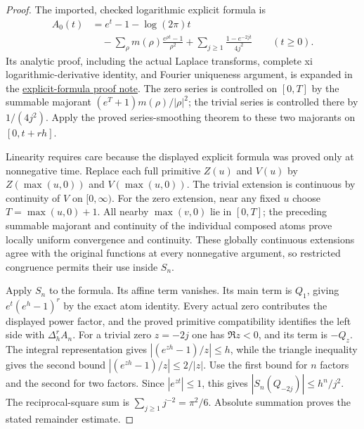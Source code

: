 \begin{proof}
The imported, checked logarithmic explicit formula is
\[
 \begin{aligned}
 A_0(t)&=e^t-1-\log(2\pi)t\\
 &\quad-\sum_\rho m(\rho)\frac{e^{\rho t}-1}{\rho^2}
 +\sum_{j\geq1}\frac{1-e^{-2jt}}{4j^2}\qquad(t\geq0).
 \end{aligned}
\]
Its analytic proof, including the actual Laplace transforms, complete
xi logarithmic-derivative identity, and Fourier uniqueness argument,
is expanded in the
\href{https://github.com/TomasOrtega/Sidon/blob/master/docs/log-smoothed-explicit-formula.md}{explicit-formula proof note}.
The zero series is controlled on $[0,T]$ by the summable majorant
$(e^T+1)m(\rho)/|\rho|^2$; the trivial series is controlled there by
$1/(4j^2)$.  Apply the proved series-smoothing theorem to these two
majorants on $[0,t+rh]$.

Linearity requires care because the displayed explicit formula was
proved only at nonnegative time.  Replace each full primitive $Z(u)$
and $V(u)$ by $Z(\max(u,0))$ and $V(\max(u,0))$.
The trivial extension is continuous by continuity of $V$ on $[0,\infty)$.
For the zero extension, near any fixed $u$ choose
$T=\max(u,0)+1$.  All nearby $\max(v,0)$ lie in $[0,T]$;
the preceding summable majorant and continuity of the individual
composed atoms prove locally uniform convergence and continuity.
These globally continuous extensions agree with the original functions
at every nonnegative argument, so restricted congruence permits their
use inside $S_n$.

Apply $S_n$ to the formula.  Its affine term vanishes.
Its main term is $Q_1$, giving $e^t(e^h-1)^r$ by the exact atom identity.
Every actual zero contributes the displayed power factor, and the
proved primitive compatibility identifies the left side with
$\Delta_h^rA_n$.
For a trivial zero $z=-2j$ one has $\Re z<0$, and its term is $-Q_z$.
The integral representation gives
$|(e^{zh}-1)/z|\leq h$, while the triangle inequality gives the second
bound $|(e^{zh}-1)/z|\leq2/|z|$.
Use the first bound for $n$ factors and the second for two factors.
Since $|e^{zt}|\leq1$, this gives
$|S_n(Q_{-2j})|\leq h^n/j^2$.
The reciprocal-square sum is $\sum_{j\geq1}j^{-2}=\pi^2/6$.
Absolute summation proves the stated remainder estimate.
\end{proof}

